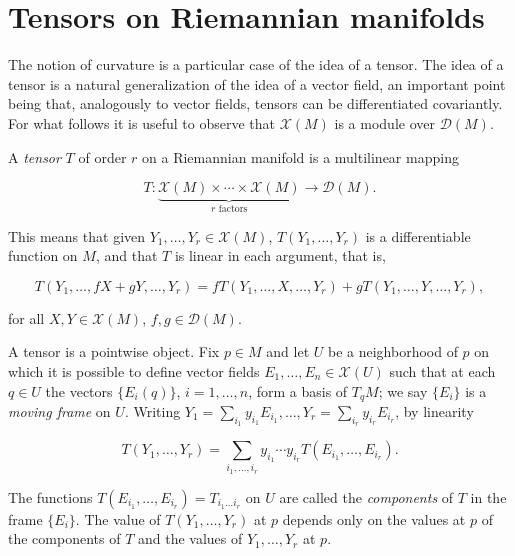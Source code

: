 \section{Tensors on Riemannian manifolds}

The notion of curvature is a particular case of the idea of a tensor. The idea of
a tensor is a natural generalization of the idea of a vector field, an important
point being that, analogously to vector fields, tensors can be differentiated
covariantly. For what follows it is useful to observe that $\mathcal{X}(M)$ is a
module over $\mathcal{D}(M)$.

\begin{definition}
  \label{def:dc-ch4-5-1}
  \leanok
  A \emph{tensor} $T$ of order $r$ on a Riemannian manifold is a multilinear mapping
  
  $$
  T:\underbrace{\mathcal{X}(M)\times\cdots\times\mathcal{X}(M)}_{r\text{ factors}}\to\mathcal{D}(M).
  $$
  
  This means that given $Y_1,\dots,Y_r\in\mathcal{X}(M)$, $T(Y_1,\dots,Y_r)$ is a
  differentiable function on $M$, and that $T$ is linear in each argument, that is,
  
  $$
  T(Y_1,\dots,fX+gY,\dots,Y_r)=fT(Y_1,\dots,X,\dots,Y_r)+gT(Y_1,\dots,Y,\dots,Y_r),
  $$
  
  for all $X,Y\in\mathcal{X}(M)$, $f,g\in\mathcal{D}(M)$.
  
  A tensor is a pointwise object. Fix $p\in M$ and let $U$ be a neighborhood of $p$
  on which it is possible to define vector fields $E_1,\dots,E_n\in\mathcal{X}(U)$
  such that at each $q\in U$ the vectors $\{E_i(q)\}$, $i=1,\dots,n$, form a basis of
  $T_qM$; we say $\{E_i\}$ is a \emph{moving frame} on $U$. Writing
  $Y_1=\sum_{i_1}y_{i_1}E_{i_1},\dots,Y_r=\sum_{i_r}y_{i_r}E_{i_r}$, by linearity
  
  $$
  T(Y_1,\dots,Y_r)=\sum_{i_1,\dots,i_r}y_{i_1}\cdots y_{i_r}T(E_{i_1},\dots,E_{i_r}).
  $$
  
  The functions $T(E_{i_1},\dots,E_{i_r})=T_{i_1\dots i_r}$ on $U$ are called the
  \emph{components} of $T$ in the frame $\{E_i\}$. The value of $T(Y_1,\dots,Y_r)$ at $p$
  depends only on the values at $p$ of the components of $T$ and the values of
  $Y_1,\dots,Y_r$ at $p$.
\end{definition}

